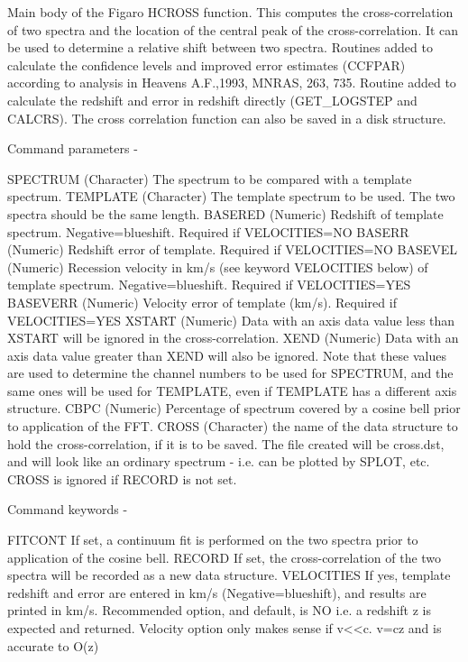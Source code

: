 \begin{description}
\begin{description}
\begin{terminalv}
 Main body of the Figaro HCROSS function.  This computes
 the cross-correlation of two spectra and the location of the
 central peak of the cross-correlation.  It can be used to
 determine a relative shift between two spectra. Routines added to
 calculate the confidence levels and improved error estimates (CCFPAR)
 according to analysis in Heavens A.F.,1993, MNRAS, 263, 735.
 Routine added to calculate the redshift and error in redshift
 directly (GET_LOGSTEP and CALCRS).  The cross correlation
 function can also be saved in a disk structure.

 Command parameters -

 SPECTRUM    (Character) The spectrum to be compared with
             a template spectrum.
 TEMPLATE    (Character) The template spectrum to be used.
             The two spectra should be the same length.
 BASERED     (Numeric) Redshift of template spectrum.
             Negative=blueshift.  Required if VELOCITIES=NO
 BASERR      (Numeric) Redshift error of template.
             Required if VELOCITIES=NO
 BASEVEL     (Numeric) Recession velocity in km/s
             (see keyword VELOCITIES below) of template spectrum.
             Negative=blueshift. Required if VELOCITIES=YES
 BASEVERR    (Numeric) Velocity error of template (km/s).
             Required if VELOCITIES=YES
 XSTART      (Numeric) Data with an axis data value less than XSTART
             will be ignored in the cross-correlation.
 XEND        (Numeric) Data with an axis data value greater than XEND
             will also be ignored.  Note that these values are
             used to determine the channel numbers to be used
             for SPECTRUM, and the same ones will be used for
             TEMPLATE, even if TEMPLATE has a  different axis
             structure.
 CBPC        (Numeric) Percentage of spectrum covered by a cosine
             bell prior to application of the FFT.
 CROSS       (Character) the name of the data structure to hold
             the cross-correlation, if it is to be saved.
             The file created will be cross.dst, and will look
             like an ordinary spectrum - i.e. can be plotted by
             SPLOT, etc.  CROSS is ignored if RECORD is not
             set.

 Command keywords -

 FITCONT     If set, a continuum fit is performed on the two
             spectra prior to application of the cosine bell.
 RECORD      If set, the cross-correlation of the two spectra
             will be recorded as a new data structure.
 VELOCITIES  If yes, template redshift and error are entered in
             km/s (Negative=blueshift), and results are printed in km/s.
             Recommended option, and default, is NO
             i.e. a redshift z is expected and returned.
             Velocity option only makes sense if v<<c.
             v=cz and is accurate to O(z)


\end{terminalv}
\end{description}
\end{description}
